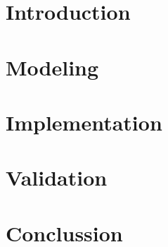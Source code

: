 \documentclass[11pt,a4paper,fleqn]{article}
\begin{document}

\newpage

\tableofcontents
\newpage


\section{Introduction}%
\label{sec:introduction}


\section{Modeling}%
\label{sec:modeling}


\section{Implementation}%
\label{sec:implementation}


\section{Validation}%
\label{sec:validation}


\section{Conclussion}%
\label{sec:conlclussion}





{}

\end{document}
